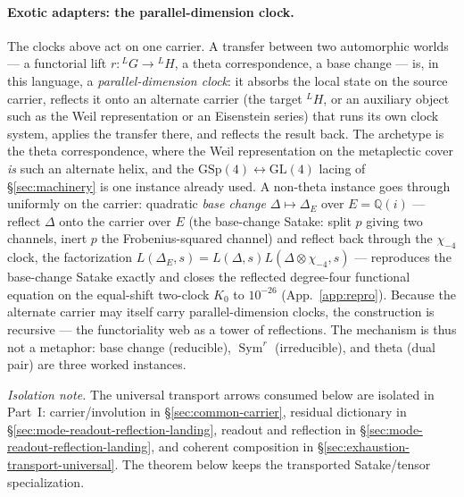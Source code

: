\documentclass[11pt]{article}
\theoremstyle{definition}
\newcommand{\Sym}{\operatorname{Sym}}
\begin{document}
\paragraph{Exotic adapters: the parallel-dimension clock.} The clocks above act on one carrier. A
transfer between two automorphic worlds --- a functorial lift $r:{}^{L}G\to{}^{L}H$, a theta
correspondence, a base change --- is, in this language, a \emph{parallel-dimension clock}: it absorbs the
local state on the source carrier, reflects it onto an alternate carrier (the target ${}^{L}H$, or an
auxiliary object such as the Weil representation or an Eisenstein series) that runs its own clock system,
applies the transfer there, and reflects the result back. The archetype is the theta correspondence, where
the Weil representation on the metaplectic cover \emph{is} such an alternate helix, and the
$\mathrm{GSp}(4)\leftrightarrow\mathrm{GL}(4)$ lacing of \S\ref{sec:machinery} is one instance already
used. A non-theta instance goes through uniformly on the carrier: quadratic \emph{base change}
$\Delta\mapsto\Delta_E$ over $E=\mathbb Q(i)$ --- reflect $\Delta$ onto the carrier over $E$ (the
base-change Satake: split $p$ giving two channels, inert $p$ the Frobenius-squared channel) and reflect
back through the $\chi_{-4}$ clock, the factorization $L(\Delta_E,s)=L(\Delta,s)L(\Delta\otimes\chi_{-4},s)$
--- reproduces the base-change Satake exactly and closes the reflected degree-four functional equation on
the equal-shift two-clock $K_0$ to $10^{-26}$ (App.~\ref{app:repro}). Because the alternate carrier may
itself carry parallel-dimension clocks, the construction is recursive --- the functoriality web as a tower
of reflections. The mechanism is thus not a metaphor: base change (reducible), $\Sym^r$ (irreducible), and
theta (dual pair) are three worked instances.

\noindent\emph{Isolation note.} The universal transport arrows consumed below
are isolated in Part~I: carrier/involution in \S\ref{sec:common-carrier},
residual dictionary in \S\ref{sec:mode-readout-reflection-landing}, readout
and reflection in \S\ref{sec:mode-readout-reflection-landing}, and coherent
composition in \S\ref{sec:exhaustion-transport-universal}.  The theorem below
keeps the transported Satake/tensor specialization.
\end{document}
